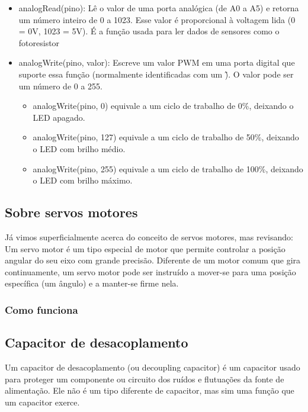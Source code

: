 \documentclass{report}
\begin{document}
	\begin{itemize}
		\item analogRead(pino): Lê o valor de uma porta analógica (de A0 a A5) e retorna um número inteiro de 0 a 1023. Esse valor é proporcional à voltagem lida (0 = 0V, 1023 = 5V). É a função usada para ler dados de sensores como o fotoresistor
		\item analogWrite(pino, valor): Escreve um valor PWM em uma porta digital que suporte essa função (normalmente identificadas com um \~). O valor pode ser um número de 0 a 255.
		\begin{itemize}
			\item analogWrite(pino, 0) equivale a um ciclo de trabalho de 0\%, deixando o LED apagado.
			\item analogWrite(pino, 127) equivale a um ciclo de trabalho de 50\%, deixando o LED com brilho médio.
			\item analogWrite(pino, 255) equivale a um ciclo de trabalho de 100\%, deixando o LED com brilho máximo.
			
		\end{itemize}
	\end{itemize}
	
	\subsection{Sobre servos motores}
	
	Já vimos superficialmente acerca do conceito de servos motores, mas revisando: Um servo motor é um tipo especial de motor que permite controlar a posição angular do seu eixo com grande precisão. Diferente de um motor comum que gira continuamente, um servo motor pode ser instruído a mover-se para uma posição específica (um ângulo) e a manter-se firme nela.
	
	\subsubsection{Como funciona}
	
	\subsection{Capacitor de desacoplamento}
	
	Um capacitor de desacoplamento (ou decoupling capacitor) é um capacitor usado para proteger um componente ou circuito dos ruídos e flutuações da fonte de alimentação. Ele não é um tipo diferente de capacitor, mas sim uma função que um capacitor exerce.
	
\end{document}
